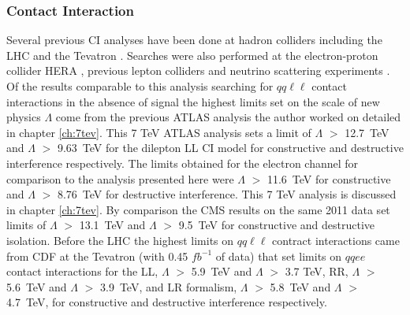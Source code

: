     \subsubsection*{Contact Interaction}
        Several previous CI analyses have been done at hadron colliders including the LHC \cite{PhysRevD.87.015010,ATLAS:2012pu,PhysRevD.87.032001,PhysRevD.87.052017} and the Tevatron \cite{PhysRevLett.103.191803,PhysRevLett.96.211801,PhysRevLett.87.231803,PhysRevLett.82.4769,PhysRevLett.79.2198,Abbiendi2003331,Abbiendi2000553}. Searches were also performed at the electron-proton collider HERA \cite{Chekanov200423,Adloff2000358,Adloff200335}, previous lepton colliders \cite{Abdallah2009.60.1,Schael2007.49.411,Abdallah2006.45.589,Abbiendi2004.33.173,Acciarri200081} and neutrino scattering experiments \cite{McFarland2005.161}. Of the results comparable to this analysis searching for $qq\ell\ell$ contact interactions in the absence of signal the highest limits set on the scale of new physics $\Lambda$ come from the previous ATLAS analysis the author worked on \cite{PhysRevD.87.015010} detailed in chapter \ref{ch:7tev}. This 7 TeV ATLAS analysis sets a limit of $\Lambda$ $>$ 12.7~TeV and $\Lambda$ $>$ 9.63~TeV for the dilepton LL CI model for constructive and destructive interference respectively. The limits obtained for the electron channel for comparison to the analysis presented here were $\Lambda$ $>$ 11.6~TeV for constructive and $\Lambda$ $>$ 8.76~TeV for destructive interference. This 7 TeV analysis is discussed in chapter \ref{ch:7tev}. By comparison the CMS results on the same 2011 data \cite{PhysRevD.87.032001} set limits of $\Lambda$ $>$ 13.1~TeV and $\Lambda$ $>$ 9.5~TeV for constructive and destructive isolation. Before the LHC the highest limits on $qq\ell\ell$ contract interactions came from CDF at the Tevatron \cite{PhysRevLett.96.211801} (with 0.45 $fb^{-1}$ of data) that set limits on $qqee$ contact interactions for the LL, $\Lambda$ $>$ 5.9~TeV and $\Lambda$ $>$ 3.7 TeV, RR, $\Lambda$ $>$ 5.6~TeV and $\Lambda$ $>$ 3.9~TeV, and LR formalism, $\Lambda$ $>$ 5.8~TeV and $\Lambda$ $>$ 4.7~TeV, for constructive and destructive interference respectively. 


